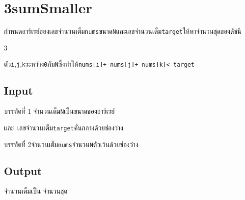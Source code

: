\documentclass{article}
\begin{document}
\section*{3sumSmaller}

กำหนดอาร์เรย์ของเลขจำนวนเต็ม\texttt{nums}ขนาด\texttt{N}และเลขจำนวนเต็ม\texttt{target}ให้หาจำนวนชุดของดัชนี

3

ตัว\texttt{i},\texttt{j},\texttt{k}ระหว่าง\texttt{0}กับ\texttt{N}ซึ่งทำให้\texttt{nums{[}i{]}+\ nums{[}j{]}+\ nums{[}k{]}\textless{}\ target}\\



\subsection*{Input}
บรรทัดที่ 1 จำนวนเต็ม\texttt{N}เป็นขนาดของอาร์เรย์

และ~เลขจำนวนเต็ม\texttt{target}{คั่นกลางด้วยช่องว่าง}



{บรรทัดที่ 2}จำนวนเต็ม\texttt{nums}จำนวน\texttt{N}ตัวเว้นด้วยช่องว่าง\\



\subsection*{Output}
จำนวนเต็มเป็น จำนวนชุด\\
\end{document}
